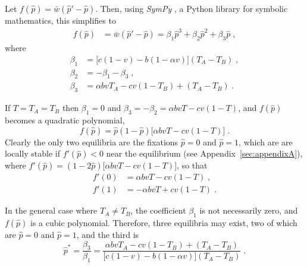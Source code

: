 \documentclass[12pt]{extarticle}
\begin{document}
\begin{appendices}
Let $f(\hat{p}) = \bar{w}(\hat{p}' - \hat{p})$.
Then, using \emph{SymPy} \citep{Meurer2017}, a Python library for symbolic mathematics, this simplifies to
\begin{equation} \label{eq:general_case_polynomial}
\begin{aligned}
  f(\hat{p}) &= \bar{w}(\hat{p}'-\hat{p}) =
  \beta_1 \hat{p}^3 + \beta_2 \hat{p}^2 + \beta_3 \hat{p} \;,
\end{aligned}
\end{equation}
where 
\begin{equation} \label{eq:polynomial_coefficients}
\begin{aligned}
  \beta_1 &= \big[c(1-v) - b (1-\alpha v)\big] (T_A-T_B) \;, \\
  \beta_2 &= -\beta_1 -\beta_3 \;, \\
  \beta_3 &= \alpha bvT_A - cv(1-T_B) + (T_A-T_B) \;.
\end{aligned}
\end{equation}

If $T=T_A=T_B$ then $\beta_1=0$ and $\beta_3=-\beta_2=\alpha b vT -cv(1-T)$, and $f(\hat{p})$ becomes a quadratic polynomial,
\begin{equation} \label{eq:equal_horizontal_transmission}
  f(\hat{p}) = \hat{p}(1-\hat{p})\big[\alpha bvT - cv(1-T)\big] \;.
\end{equation}
Clearly the only two equilibria are the fixations $\hat{p} =  0$ and $\hat{p} = 1$, which are are locally stable if $f'(\hat{p})<0$ near the equilibrium (see Appendix~\ref{sec:appendixA}), where
$f'(\hat{p})=(1-2\hat{p})\big[\alpha bvT - cv(1-T)\big]$, so that
\begin{equation} \label{eq:derivative_of_phattag-phat}
\begin{aligned}
	f'(0) &=	\alpha bvT - cv(1-T) \;, \\
	f'(1) &=	-\alpha bvT + cv(1-T) \;.
\end{aligned}
\end{equation}

In the general case where $T_A \neq T_B$, the coefficient $\beta_1$ is not necessarily zero, and $f(\hat{p})$ is a cubic polynomial.
Therefore, three equilibria may exist, two of which are
$\hat{p} = 0 $ and $\hat{p} = 1$, and the third is
\begin{equation} \label{eq:general_equilibrium_appendix}
  \hat{p}^* =  
  \frac{\beta_3}{\beta_1} =
  \frac{\alpha bvT_A - cv(1-T_B) + (T_A-T_B)}{\big[c(1-v) - b (1-\alpha v)\big] (T_A-T_B)} \;.
\end{equation}


\end{appendices}
\end{document}
